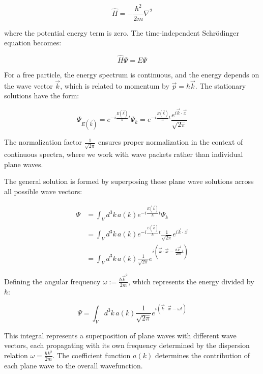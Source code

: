 \documentclass[10pt]{article}
\begin{document}
\begin{equation*}
\hat{H} = -\frac{\hbar^2}{2m}\nabla^2 \tag{3.2}
\end{equation*}

where the potential energy term is zero. The time-independent Schrödinger equation becomes:

\begin{equation*}
\hat{H}\Psi = E\Psi \tag{3.3}
\end{equation*}

For a free particle, the energy spectrum is continuous, and the energy depends on the wave vector $\vec{k}$, which is related to momentum by $\vec{p} = \hbar\vec{k}$. The stationary solutions have the form:

\begin{equation*}
\Psi_{E(\vec{k})} = e^{-i\frac{E(\vec{k})}{\hbar}t}\Psi_k = e^{-i\frac{E(\vec{k})}{\hbar}t}\frac{e^{i\vec{k}\cdot\vec{x}}}{\sqrt{2\pi}} \tag{3.4}
\end{equation*}

The normalization factor $\frac{1}{\sqrt{2\pi}}$ ensures proper normalization in the context of continuous spectra, where we work with wave packets rather than individual plane waves.

The general solution is formed by superposing these plane wave solutions across all possible wave vectors:

\begin{align*}
\Psi &= \int_V d^3k\,a(k)e^{-i\frac{E(\vec{k})}{\hbar}t}\Psi_k \\
&= \int_V d^3k\,a(k)e^{-i\frac{E(\vec{k})}{\hbar}t}\frac{1}{\sqrt{2\pi}}e^{i\vec{k}\cdot\vec{x}} \tag{3.5} \\
&= \int_V d^3k\,a(k)\frac{1}{\sqrt{2\pi}}e^{i\left(\vec{k}\cdot\vec{x} - \frac{\hbar\vec{k}^2}{2m}t\right)}
\end{align*}

Defining the angular frequency $\omega := \frac{\hbar\vec{k}^2}{2m}$, which represents the energy divided by $\hbar$:

\begin{equation*}
\Psi = \int_V d^3k\,a(k)\frac{1}{\sqrt{2\pi}}e^{i(\vec{k}\cdot\vec{x} - \omega t)} \tag{3.6}
\end{equation*}

This integral represents a superposition of plane waves with different wave vectors, each propagating with its own frequency determined by the dispersion relation $\omega = \frac{\hbar k^2}{2m}$. The coefficient function $a(k)$ determines the contribution of each plane wave to the overall wavefunction.
\end{document}
